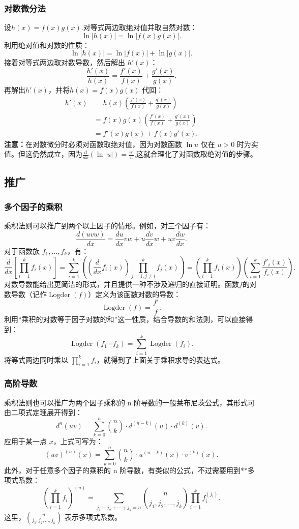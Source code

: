 \subsubsection{对数微分法}
设$h(x) = f(x)g(x)$.对等式两边取绝对值并取自然对数：
$$
\ln |h(x)| = \ln |f(x)g(x)|.~
$$
利用绝对值和对数的性质：
$$
\ln |h(x)| = \ln |f(x)| + \ln |g(x)|.~
$$
接着对等式两边取对数导数，然后解出 $h'(x)$：
$$
\frac{h'(x)}{h(x)} = \frac{f'(x)}{f(x)} + \frac{g'(x)}{g(x)}.~
$$
再解出$h'(x)$，并将$h(x)=f(x)g(x)$ 代回：
$$
\begin{aligned}
h'(x) &= h(x)\left(\frac{f'(x)}{f(x)} + \frac{g'(x)}{g(x)}\right) \\
&= f(x)g(x)\left(\frac{f'(x)}{f(x)} + \frac{g'(x)}{g(x)}\right) \\
&= f'(x)g(x) + f(x)g'(x).
\end{aligned}~
$$
\textbf{注意：}在对数微分时必须对函数取绝对值，因为对数函数 $\ln u$ 仅在 $u > 0$ 时为实值。但这仍然成立，因为$\frac{d}{dx}(\ln |u|) = \frac{u'}{u}$,这就合理化了对函数取绝对值的步骤。
\subsection{推广}
\subsubsection{多个因子的乘积}
乘积法则可以推广到两个以上因子的情形。例如，对三个因子有：
$$
\frac{d(uvw)}{dx} = \frac{du}{dx}vw + u\frac{dv}{dx}w + uv\frac{dw}{dx}.~
$$
对于函数族 $f_{1}, \dots , f_{k}$，有：
$$
\frac{d}{dx}\left[\prod_{i=1}^{k} f_{i}(x)\right] 
= \sum_{i=1}^{k}\left(\left(\frac{d}{dx}f_{i}(x)\right)\prod_{j=1, j\neq i}^{k} f_{j}(x)\right) 
= \left(\prod_{i=1}^{k} f_{i}(x)\right)\left(\sum_{i=1}^{k}\frac{f'_{i}(x)}{f_{i}(x)}\right).~
$$
对数导数能给出更简洁的形式，并且提供一种不涉及递归的直接证明。函数$f$的对数导数（记作$\operatorname{Logder}(f)$）定义为该函数对数的导数：
$$
\operatorname{Logder}(f) = \frac{f'}{f}.~
$$
利用“乘积的对数等于因子对数的和”这一性质，结合导数的和法则，可以直接得到：
$$
\operatorname{Logder}(f_{1}\cdots f_{k}) = \sum_{i=1}^{k}\operatorname{Logder}(f_{i}).~
$$
将等式两边同时乘以 $\prod_{i=1}^{k} f_{i}$，就得到了上面关于乘积求导的表达式。
\subsubsection{高阶导数}
乘积法则也可以推广为两个因子乘积的 n 阶导数的一般莱布尼茨公式，其形式可由二项式定理展开得到：
$$
d^{n}(uv) = \sum_{k=0}^{n} {n \choose k} \cdot d^{(n-k)}(u) \cdot d^{(k)}(v).~
$$
应用于某一点 $x$，上式可写为：
$$
(uv)^{(n)}(x) = \sum_{k=0}^{n} {n \choose k} \cdot u^{(n-k)}(x) \cdot v^{(k)}(x).~
$$
此外，对于任意多个因子的乘积的 n 阶导数，有类似的公式，不过需要用到**多项式系数：
$$
\left(\prod_{i=1}^{k} f_{i}\right)^{(n)} 
= \sum_{j_{1}+j_{2}+\cdots+j_{k}=n} 
{n \choose j_{1}, j_{2}, \ldots, j_{k}} 
\prod_{i=1}^{k} f_{i}^{(j_{i})}.~
$$
这里，${n \choose j_{1}, j_{2}, \ldots, j_{k}}$ 表示多项式系数。 
